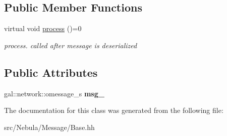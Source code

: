 \subsection*{\-Public \-Member \-Functions}
\begin{DoxyCompactItemize}
\item 
\hypertarget{classNeb_1_1Message_1_1IBase_a3552e205d83f5d207f04a12431030c64}{virtual void \hyperlink{classNeb_1_1Message_1_1IBase_a3552e205d83f5d207f04a12431030c64}{process} ()=0}\label{classNeb_1_1Message_1_1IBase_a3552e205d83f5d207f04a12431030c64}

\begin{DoxyCompactList}\small\item\em process. called after message is deserialized \end{DoxyCompactList}\end{DoxyCompactItemize}
\subsection*{\-Public \-Attributes}
\begin{DoxyCompactItemize}
\item 
\hypertarget{classNeb_1_1Message_1_1IBase_aa72a4644dea3cae4f12360f50bfca0ef}{gal\-::network\-::omessage\-\_\-s {\bfseries msg\-\_\-}}\label{classNeb_1_1Message_1_1IBase_aa72a4644dea3cae4f12360f50bfca0ef}

\end{DoxyCompactItemize}


\-The documentation for this class was generated from the following file\-:\begin{DoxyCompactItemize}
\item 
src/\-Nebula/\-Message/\-Base.\-hh\end{DoxyCompactItemize}
